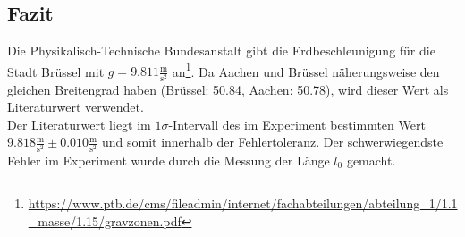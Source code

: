 \subsection{Fazit}
Die Physikalisch-Technische Bundesanstalt gibt die Erdbeschleunigung für die Stadt Brüssel mit $g = 9.811 \frac{\text{m}}{\text{s}^2}$ an\footnote{\url{https://www.ptb.de/cms/fileadmin/internet/fachabteilungen/abteilung_1/1.1_masse/1.15/gravzonen.pdf}}. Da Aachen und Brüssel näherungsweise den gleichen Breitengrad haben (Brüssel: 50.84\textdegree, Aachen: 50.78\textdegree), wird dieser Wert als Literaturwert verwendet. \\
Der Literaturwert liegt im $1\sigma$-Intervall des im Experiment bestimmten Wert $9.818 \frac{\text{m}}{\text{s}^2} \pm 0.010 \frac{\text{m}}{\text{s}^2}$ und somit innerhalb der Fehlertoleranz. Der schwerwiegendste Fehler im Experiment wurde durch die Messung der Länge $l_0$ gemacht. 